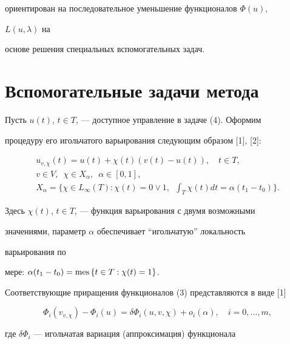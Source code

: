 ориентирован на последовательное уменьшение функционалов $\Phi(u)$, 


$L(u,\lambda)$ на 


основе решения специальных вспомогательных задач. 


 


\section{Вспомогательные задачи метода} 


 


Пусть $u(t)$, $t\in T$, --- доступное управление в задаче (4). Оформим 


процедуру его игольчатого варьирования следующим образом [1], [2]: 


\begin{gather*} 


u_{v,\chi}(t)=u(t)+\chi(t)(v(t)-u(t)),\quad t\in T,\\ 


v\in V,\ \;\chi\in X_\alpha,\ \; \alpha\in[0,1],\\ 


X_\alpha=\bigg\{\chi\in L_\infty(T): 


\chi(t)=0\vee 1,\ \; \int_T\chi(t)dt=\alpha(t_1-t_0)\bigg\}. 


\end{gather*} 


Здесь $\chi(t)$, $t\in T$, --- функция варьирования с двумя возможными 


значениями, параметр $\alpha$ обеспечивает ``игольчатую'' локальность 


варьирования по 


мере: $\alpha(t_1-t_0)=\text{mes\,}\{t\in T:\chi(t)=1\}$. 


 


Соответствующие приращения функционалов (3) представляются в виде [1] 


\begin{equation} 


\Phi_i(v_{v,\chi})-\Phi_i(u)=\delta\Phi_i(u,v,\chi)+ 


o_i(\alpha),\quad i=0,\dotsc,m, 


\end{equation} 


где $\delta\Phi_i$ --- игольчатая вариация (аппроксимация) функционала 


